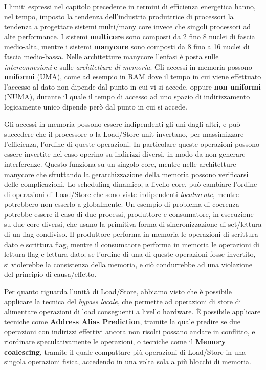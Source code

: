 I limiti espressi nel capitolo precedente in termini di efficienza energetica hanno, nel tempo, imposto la tendenza dell'industria produttrice di processori la tendenza a progettare sistemi multi/many core invece che singoli processori ad alte performance. 
I sistemi \textbf{multicore} sono composti da 2 fino 8 nuclei di fascia medio-alta, mentre i sistemi \textbf{manycore} sono composti da 8 fino a 16 nuclei di fascia medio-bassa. Nelle architetture manycore l'enfasi è posta sulle \textit{interconnesioni} e sulle \textit{architetture di memoria}. Gli accessi in memoria possono \textbf{uniformi} (UMA), come ad esempio in RAM dove il tempo in cui viene effettuato l'accesso al dato non dipende dal punto in cui vi si accede, oppure \textbf{non uniformi} (NUMA), durante il quale il tempo di accesso ad uno spazio di indirizzamento logicamente unico dipende però dal punto in cui si accede. 

\noindent Gli accessi in memoria possono essere indipendenti gli uni dagli altri, e può succedere che il processore o la Load/Store unit invertano, per massimizzare l'efficienza, l'ordine di queste operazioni. In particolare queste operazioni possono essere invertite nel caso operino su indirizzi diversi, in modo da non generare interferenze. Questo funziona su un singolo core, mentre nelle architetture manycore che sfruttando la gerarchizzazione della memoria possono verificarsi delle complicazioni. Lo scheduling dinamico, a livello core, può cambiare l'ordine di operazioni di Load/Store che sono viste indipendenti \textit{localmente}, mentre potrebbero non esserlo a globalmente. Un esempio di problema di coerenza potrebbe essere il caso di due processi, produttore e consumatore, in esecuzione su due core diversi, che usano la primitiva forma di sincronizzazione di set/lettura di un flag condiviso. Il produttore performa in memoria le operazioni di scrittura dato e scrittura flag, mentre il consumatore performa in memoria le operazioni di lettura flag e lettura dato; se l'ordine di una di queste operazioni fosse invertito, si violerebbe la consistenza della memoria, e ciò condurrebbe ad una violazione del principio di causa/effetto.  

\noindent Per quanto riguarda l'unità di Load/Store, abbiamo visto che è possibile applicare la tecnica del \textit{bypass locale}, che permette ad operazioni di store di alimentare operazioni di load conseguenti a livello hardware. \uppercase{è} possibile applicare tecniche come \textbf{Address Alias Prediction}, tramite la quale predire se due operazioni con indirizzi effettivi ancora non risolti possano andare in conflitto, e riordinare speculativamente le operazioni, o tecniche come il \textbf{Memory coalescing}, tramite il quale compattare più operazioni di Load/Store in una singola operazioni fisica, accedendo in una volta sola a più blocchi di memoria. 


